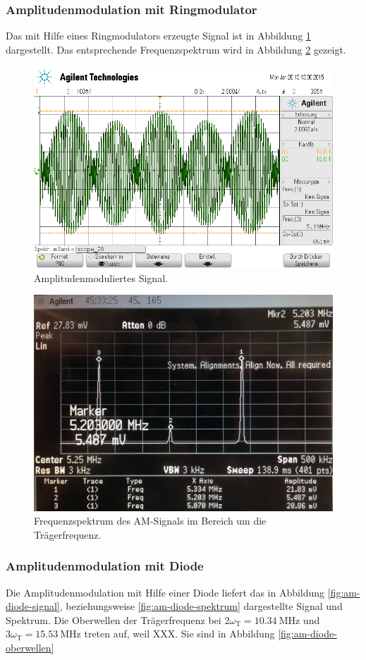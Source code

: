 \subsubsection{Amplitudenmodulation mit Ringmodulator}
\label{subsubsec:am-ringmodulator}
Das mit Hilfe eines Ringmodulators erzeugte Signal ist in Abbildung
\ref{fig:am-signal} dargestellt.
Das entsprechende Frequenzspektrum wird in Abbildung \ref{fig:am-spektrum}
gezeigt.
\begin{figure}
    \centering
    \includegraphics[width=0.8\linewidth]{images/am-signal.png}
    \caption{Amplitudenmoduliertes Signal.}
    \label{fig:am-signal}
\end{figure}
\begin{figure}
    \centering
    \includegraphics[width=0.8\linewidth]{images/am-spektrum.jpg}
    \caption{
        Frequenzspektrum des AM-Signals im Bereich um die
        Trägerfrequenz.
    }
    \label{fig:am-spektrum}
\end{figure}

\subsubsection{Amplitudenmodulation mit Diode}
\label{subsubsec:am-ringmodulator}
Die Amplitudenmodulation mit Hilfe einer Diode liefert das in Abbildung
\ref{fig:am-diode-signal}, beziehungsweise \ref{fig:am-diode-spektrum}
dargestellte Signal und Spektrum. Die Oberwellen der Trägerfrequenz bei
$2\omega_\text{T} = \SI{10.34}{\mega\hertz}$ und
$3\omega_\text{T} = \SI{15.53}{\mega\hertz}$ treten auf, weil XXX.
Sie sind in Abbildung \ref{fig:am-diode-oberwellen}

